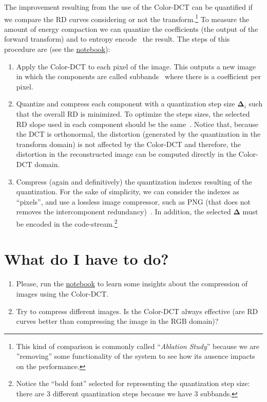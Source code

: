 The improvement resulting from the use of the Color-DCT can be
quantified if we compare the RD curves considering or not the
transform.\footnote{This kind of comparison is commonly called
``\emph{Ablation Study}'' because we are ''removing'' some
functionality of the system to see how its ausence impacts on the
performance.} To measure the amount of energy compaction we can
quantize the coefficients (the output of the forward transform) and to
entropy encode~\cite{vruiz__information_theory} the result. The steps
of this procedure are (see the
\href{https://github.com/Sistemas-Multimedia/Sistemas-Multimedia.github.io/blob/master/contents/color_DCT/RD_performance.ipynb}{notebook}):
\begin{enumerate}
\item Apply the Color-DCT to each pixel of the image. This outputs a
  new image in which the components are called
  subbands~\cite{vruiz__transform_coding} where there is a coefficient
  per pixel.
\item Quantize and compress each component with a quantization step
  size ${\mathbf\Delta}_i$ such that the overall RD is minimized. To
  optimize the steps sizes, the selected RD slope used in each
  component should be the
  same~\cite{vruiz__information_theory,vetterli2014foundations}. Notice
  that, because the DCT is orthonormal, the distortion (generated by
  the quantization in the transform domain) is not affected by the
  Color-DCT and therefore, the distortion in the reconstructed image
  can be computed directly in the Color-DCT domain.
\item Compress (again and definitively) the quantization indexes
  resulting of the quantization. For the sake of simplicity, we can
  consider the indexes as ``pixels'', and use a lossless image
  compressor, such as PNG (that does not removes the intercomponent
  redundancy)~\cite{vruiz__PNG}. In addition, the selected
  ${\mathbf\Delta}$ must be encoded in the
  code-stream.\footnote{Notice the ``bold font'' selected for
  representing the quantization step size: there are 3 different
  quantization steps because we have 3 subbands.}
\end{enumerate}

\section{What do I have to do?}

\begin{enumerate}
\item Please, run the
  \href{https://github.com/Sistemas-Multimedia/Sistemas-Multimedia.github.io/blob/master/contents/color_DCT/RD_performance.ipynb}{notebook}
  to learn some insights about the compression of images using the
  Color-DCT.
\item Try to compress different images. Is the Color-DCT always
  effective (are RD curves better than compressing the image in
  the RGB domain)?
\end{enumerate}

